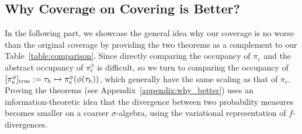 \documentclass[twoside]{article}
\newtheorem{theorem}{Theorem}
\newcommand{\CAL}[1]{\mathcal{#1}}
\newcommand{\yplu}[1]{{\color{orange}{ [\textbf{Yiping:}} #1]}}
\begin{document}
\subsection{Why Coverage on Covering is Better?}
In the following part, we showcase the general idea why our coverage is no worse than the original coverage by providing the two theorems as a complement to our Table~\ref{table:comparison}. Since directly comparing the occupancy of $\pi_e$ and the abstract occupancy of $\pi_e^\phi$ is difficult, so we turn to comparing the occupancy of $[\pi_e^\phi]_{\rm true}:=\tau_h\mapsto\pi_e^\phi(\phi(\tau_h))$, which generally have the same scaling as that of $\pi_e$. Proving the theorems (see Appendix~\ref{appendix:why_better}) uses an information-theoretic idea that the divergence between two probability measures becomes smaller on a coarser $\sigma$-algebra, using the variational representation of $f$-divergences.

\end{document}
